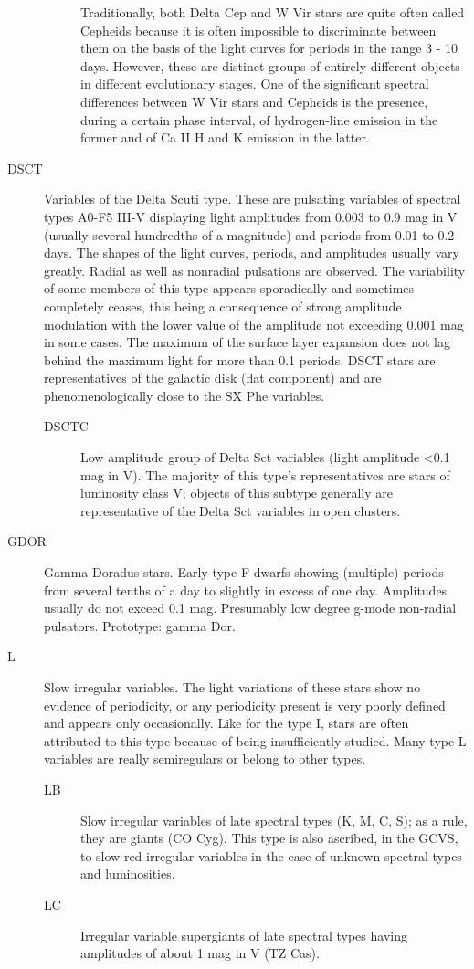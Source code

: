 \begin{description}
\begin{description}
				Traditionally, both Delta Cep and W Vir stars are quite often called
				Cepheids because it is often impossible to discriminate between them on
				the basis of the light curves for periods in the range 3 - 10 days.
				However, these are distinct groups of entirely different objects in
				different evolutionary stages. One of the significant spectral
				differences between W Vir stars and Cepheids is the presence, during a
				certain phase interval, of hydrogen-line emission in the former and of
				Ca II H and K emission in the latter.
	\end{description}		
\item[DSCT]		Variables of the Delta Scuti type. These are pulsating
				variables of spectral types A0-F5 III-V displaying light amplitudes from
				0.003 to 0.9 mag in V (usually several hundredths of a magnitude) and
				periods from 0.01 to 0.2 days. The shapes of the light curves, periods,
				and amplitudes usually vary greatly. Radial as well as nonradial
				pulsations are observed. The variability of some members of this type
				appears sporadically and sometimes completely ceases, this being a
				consequence of strong amplitude modulation with the lower value of the
				amplitude not exceeding 0.001 mag in some cases. The maximum of the
				surface layer expansion does not lag behind the maximum light for more
				than 0.1 periods. DSCT stars are representatives of the galactic disk
				(flat component) and are phenomenologically close to the SX Phe
				variables.
	\begin{description}
\item[DSCTC] 	Low amplitude group of Delta Sct variables (light
				amplitude \textless{}0.1 mag in V). The majority of this type's
				representatives are stars of luminosity class V; objects of this subtype
				generally are representative of the Delta Sct variables in open
				clusters.
	\end{description}
\item[GDOR]     Gamma Doradus stars. Early type F dwarfs showing
                (multiple) periods from several tenths of a day to slightly in excess of
                one day. Amplitudes usually do not exceed 0.1 mag. Presumably low degree
                g-mode non-radial pulsators. Prototype: gamma Dor.
\item[L]		Slow irregular variables. The light variations of these
				stars show no evidence of periodicity, or any periodicity present is
				very poorly defined and appears only occasionally. Like for the type I,
				stars are often attributed to this type because of being insufficiently
				studied. Many type L variables are really semiregulars or belong to
				other types.
	\begin{description}
\item[LB]		Slow irregular variables of late spectral types (K, M, C,
				S); as a rule, they are giants (CO Cyg). This type is also ascribed, in
				the GCVS, to slow red irregular variables in the case of unknown
				spectral types and luminosities.
\item[LC]		Irregular variable supergiants of late spectral types
				having amplitudes of about 1 mag in V (TZ Cas).


\end{description}
\end{description}
